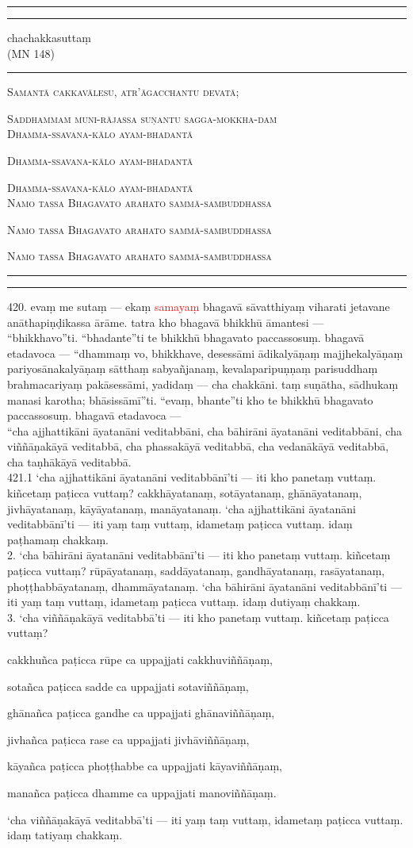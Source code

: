 \documentclass[11pt]{article}
\newcommand*{\titlePaliSuttaTitlePage}{\begingroup %
\newlength{\drop} %
\drop=0.1\textheight %

\rule{\textwidth}{1pt}\par %
\vspace{2pt}\vspace{-\baselineskip} %
\rule{\textwidth}{0.4pt}\par %

\vspace{\drop} %
\centering %

{\Huge chachakkasuttaṃ}\\[1\baselineskip] %
{\large (MN 148)}

\vspace{0.25\drop} %
\rule{0.3\textwidth}{0.4pt}\par %
\vspace{\drop} %

{\large\textsc{Samantā cakkavālesu, atr'āgacchantu devatā;}}\par
{\large\textsc{Saddhammaṁ muni-rājassa suṇantu sagga-mokkha-daṁ}}\\[2\baselineskip]


{\large\textsc{Dhamma-ssavana-kālo  ayam-bhadantā}}\par
{\large\textsc{Dhamma-ssavana-kālo  ayam-bhadantā}}\par
{\large\textsc{Dhamma-ssavana-kālo  ayam-bhadantā}}\\[2\baselineskip]


{\large \textsc{Namo tassa Bhagavato arahato sammā-sambuddhassa}}\par %
{\large \textsc{Namo tassa Bhagavato arahato sammā-sambuddhassa}}\par %
{\large \textsc{Namo tassa Bhagavato arahato sammā-sambuddhassa}}\par %
\vspace*{\drop} %

\rule{\textwidth}{0.4pt}\par %
\vspace{2pt}\vspace{-\baselineskip} %
\rule{\textwidth}{1pt}\par %
\pagebreak
\endgroup}
\newcommand{\nom}[1]{\textcolor{red}{#1}}
\begin{document}
\titlePaliSuttaTitlePage
 
420. evaṃ me sutaṃ — ekaṃ \nom{samayaṃ} bhagavā sāvatthiyaṃ viharati jetavane anāthapiṇḍikassa ārāme. tatra kho bhagavā bhikkhū āmantesi —\\

“bhikkhavo”ti. “bhadante”ti te bhikkhū bhagavato paccassosuṃ. bhagavā etadavoca — “dhammaṃ vo, bhikkhave, desessāmi ādikalyāṇaṃ majjhekalyāṇaṃ pariyosānakalyāṇaṃ sātthaṃ sabyañjanaṃ, kevalaparipuṇṇaṃ parisuddhaṃ brahmacariyaṃ pakāsessāmi, yadidaṃ — cha chakkāni. taṃ suṇātha, sādhukaṃ manasi karotha; bhāsissāmī”ti. “evaṃ, bhante”ti kho te bhikkhū bhagavato paccassosuṃ. bhagavā etadavoca —\\

“cha ajjhattikāni āyatanāni veditabbāni, cha bāhirāni āyatanāni veditabbāni, cha viññāṇakāyā veditabbā, cha phassakāyā veditabbā, cha vedanākāyā veditabbā, cha taṇhākāyā veditabbā.\\

421.1 ‘cha ajjhattikāni āyatanāni veditabbānī’ti — iti kho panetaṃ vuttaṃ. kiñcetaṃ paṭicca vuttaṃ? cakkhāyatanaṃ, sotāyatanaṃ, ghānāyatanaṃ, jivhāyatanaṃ, kāyāyatanaṃ, manāyatanaṃ. ‘cha ajjhattikāni āyatanāni veditabbānī’ti — iti yaṃ taṃ vuttaṃ, idametaṃ paṭicca vuttaṃ. idaṃ paṭhamaṃ chakkaṃ.\\

2. ‘cha bāhirāni āyatanāni veditabbānī’ti — iti kho panetaṃ vuttaṃ. kiñcetaṃ paṭicca vuttaṃ? rūpāyatanaṃ, saddāyatanaṃ, gandhāyatanaṃ, rasāyatanaṃ, phoṭṭhabbāyatanaṃ, dhammāyatanaṃ. ‘cha bāhirāni āyatanāni veditabbānī’ti — iti yaṃ taṃ vuttaṃ, idametaṃ paṭicca vuttaṃ. idaṃ dutiyaṃ chakkaṃ.\\

3. ‘cha viññāṇakāyā veditabbā’ti — iti kho panetaṃ vuttaṃ. kiñcetaṃ paṭicca vuttaṃ?\

cakkhuñca paṭicca rūpe ca uppajjati cakkhuviññāṇaṃ,\

sotañca paṭicca sadde ca uppajjati sotaviññāṇaṃ,\

ghānañca paṭicca gandhe ca uppajjati ghānaviññāṇaṃ,\

jivhañca paṭicca rase ca uppajjati jivhāviññāṇaṃ,\

kāyañca paṭicca phoṭṭhabbe ca uppajjati kāyaviññāṇaṃ,\

manañca paṭicca dhamme ca uppajjati manoviññāṇaṃ.\

‘cha viññāṇakāyā veditabbā’ti — iti yaṃ taṃ vuttaṃ, idametaṃ paṭicca vuttaṃ. idaṃ tatiyaṃ chakkaṃ.\\
\end{document}
